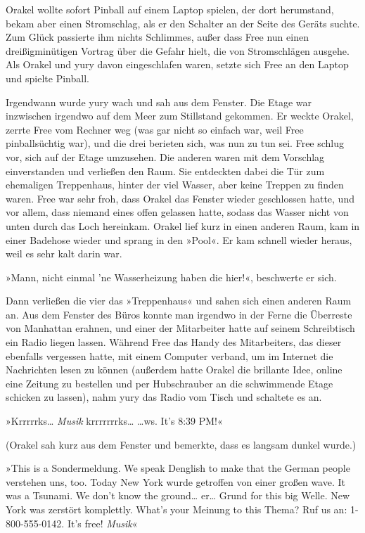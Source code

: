 Orakel wollte sofort Pinball auf einem Laptop spielen, der dort herumstand, bekam aber einen Stromschlag, als er den Schalter an der Seite des Geräts suchte. Zum Glück passierte ihm nichts Schlimmes, außer dass Free nun einen dreißigminütigen Vortrag über die Gefahr hielt, die von Stromschlägen ausgehe. Als Orakel und yury davon eingeschlafen waren, setzte sich Free an den Laptop und spielte Pinball.

Irgendwann wurde yury wach und sah aus dem Fenster. Die Etage war inzwischen irgendwo auf dem Meer zum Stillstand gekommen. Er weckte Orakel, zerrte Free vom Rechner weg (was gar nicht so einfach war, weil Free pinballsüchtig war), und die drei berieten sich, was nun zu tun sei. Free schlug vor, sich auf der Etage umzusehen. Die anderen waren mit dem Vorschlag einverstanden und verließen den Raum. Sie entdeckten dabei die Tür zum ehemaligen Treppenhaus, hinter der viel Wasser, aber keine Treppen zu finden waren. Free war sehr froh, dass Orakel das Fenster wieder geschlossen hatte, und vor allem, dass niemand eines offen gelassen hatte, sodass das Wasser nicht von unten durch das Loch hereinkam. Orakel lief kurz in einen anderen Raum, kam in einer Badehose wieder und sprang in den »Pool«. Er kam schnell wieder heraus, weil es sehr kalt darin war.

»Mann, nicht einmal ’ne Wasserheizung haben die hier!«, beschwerte er sich.

Dann verließen die vier das »Treppenhaus« und sahen sich einen anderen Raum an. Aus dem Fenster des Büros konnte man irgendwo in der Ferne die Überreste von Manhattan erahnen, und einer der Mitarbeiter hatte auf seinem Schreibtisch ein Radio liegen lassen. Während Free das Handy des Mitarbeiters, das dieser ebenfalls vergessen hatte, mit einem Computer verband, um im Internet die Nachrichten lesen zu können (außerdem hatte Orakel die brillante Idee, online eine Zeitung zu bestellen und per Hubschrauber an die schwimmende Etage schicken zu lassen), nahm yury das Radio vom Tisch und schaltete es an.

»Krrrrrks… \textit{Musik} krrrrrrrks… …ws. It’s 8:39 PM!«

(Orakel sah kurz aus dem Fenster und bemerkte, dass es langsam dunkel wurde.)

»This is a Sondermeldung. We speak Denglish to make that the German people verstehen uns, too. Today New York wurde getroffen von einer großen wave. It was a Tsunami. We don’t know the ground… er… Grund for this big Welle. New York was zerstört komplettly. What’s your Meinung to this Thema? Ruf us an: 1-800-555-0142. It’s free! \textit{Musik}«

